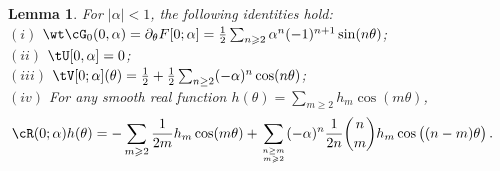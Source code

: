\documentclass[a4paper,reqno,10pt]{article}
\newtheorem{lem}{Lemma}[section]
\newcommand{\pa}{\partial}
\begin{document}
\begin{lem}\label{Id-lem-int}
    For $|\alpha|<1$, the following identities hold:
   \\[1mm]
   \noindent $(i)$ $ \wt\cG_0(0,\alpha)=\pa_\theta F[0;\alpha] 
   =\tfrac{1}{2}\sum_{n\geqslant 2} \alpha^{n}(-1)^{n+1}  \sin(n \theta)$;
   \\[1mm]
   \noindent $(ii)$ $ \tU[0,\alpha]=0$;
   \\[1mm]
   \noindent $(iii)$ $ \tV[0;\alpha](\theta) = \tfrac12+\tfrac{1}{2}\sum_{n\geq 2} (-\alpha)^{n}  \cos(n \theta)$;
\\[1mm]
\noindent $(iv)$ For any smooth  real function  $h(\theta)=\sum_{m\geqslant2}h_m \cos(m\theta)$,
\begin{align*}
		\cR(0;\alpha) h(\theta)& = -\sum_{m\geqslant2}\frac{1}{2m}h_m \cos(m\theta) + \sum_{n\geq m\atop
        m\geqslant2} (-\alpha)^{n}\frac{1}{2n}\binom{n}{m} h_m \cos\big((n-m) \theta\big)\,.
	\end{align*}
\end{lem}
\end{document}
